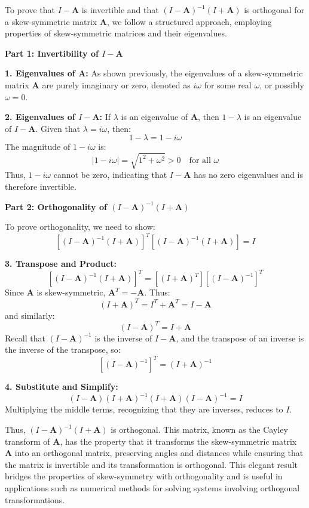 \documentclass[8pt]{article}
\begin{document}
{{To prove that \(I - \mathbf{A}\) is invertible and that \((I - \mathbf{A})^{-1}(I + \mathbf{A})\) is orthogonal for a skew-symmetric matrix \(\mathbf{A}\), we follow a structured approach, employing properties of skew-symmetric matrices and their eigenvalues.

\textbf{Part 1: Invertibility of \(I - \mathbf{A}\)}

\textbf{1. Eigenvalues of \(\mathbf{A}\):}
   As shown previously, the eigenvalues of a skew-symmetric matrix \(\mathbf{A}\) are purely imaginary or zero, denoted as \(i\omega\) for some real \(\omega\), or possibly \(\omega = 0\).

\textbf{2. Eigenvalues of \(I - \mathbf{A}\):}
   If \(\lambda\) is an eigenvalue of \(\mathbf{A}\), then \(1 - \lambda\) is an eigenvalue of \(I - \mathbf{A}\). Given that \(\lambda = i\omega\), then:
   \[
   1 - \lambda = 1 - i\omega
   \]
   The magnitude of \(1 - i\omega\) is:
   \[
   |1 - i\omega| = \sqrt{1^2 + \omega^2} > 0 \quad \text{for all } \omega
   \]
   Thus, \(1 - i\omega\) cannot be zero, indicating that \(I - \mathbf{A}\) has no zero eigenvalues and is therefore invertible.

\textbf{Part 2: Orthogonality of \((I - \mathbf{A})^{-1}(I + \mathbf{A})\)}

To prove orthogonality, we need to show:
\[
\left[(I - \mathbf{A})^{-1}(I + \mathbf{A})\right]^T \left[(I - \mathbf{A})^{-1}(I + \mathbf{A})\right] = I
\]

\textbf{3. Transpose and Product:}
   \[
   \left[(I - \mathbf{A})^{-1}(I + \mathbf{A})\right]^T = \left[(I + \mathbf{A})^T \right] \left[(I - \mathbf{A})^{-1}\right]^T
   \]
   Since \(\mathbf{A}\) is skew-symmetric, \(\mathbf{A}^T = -\mathbf{A}\). Thus:
   \[
   (I + \mathbf{A})^T = I^T + \mathbf{A}^T = I - \mathbf{A}
   \]
   and similarly:
   \[
   (I - \mathbf{A})^T = I + \mathbf{A}
   \]
   Recall that \((I - \mathbf{A})^{-1}\) is the inverse of \(I - \mathbf{A}\), and the transpose of an inverse is the inverse of the transpose, so:
   \[
   \left[(I - \mathbf{A})^{-1}\right]^T = (I + \mathbf{A})^{-1}
   \]

\textbf{4. Substitute and Simplify:}
   \[
   (I - \mathbf{A}) (I + \mathbf{A})^{-1} (I + \mathbf{A}) (I - \mathbf{A})^{-1} = I
   \]
   Multiplying the middle terms, recognizing that they are inverses, reduces to \(I\).

Thus, \((I - \mathbf{A})^{-1}(I + \mathbf{A})\) is orthogonal. This matrix, known as the Cayley transform of \(\mathbf{A}\), has the property that it transforms the skew-symmetric matrix \(\mathbf{A}\) into an orthogonal matrix, preserving angles and distances while ensuring that the matrix is invertible and its transformation is orthogonal. This elegant result bridges the properties of skew-symmetry with orthogonality and is useful in applications such as numerical methods for solving systems involving orthogonal transformations.

}}
\end{document}
